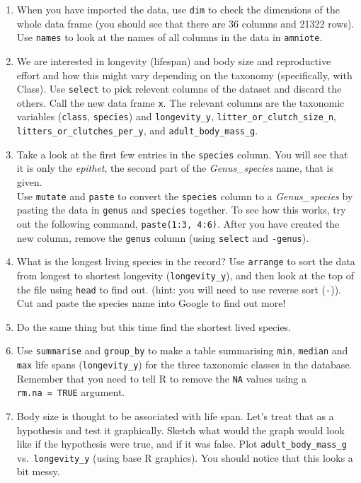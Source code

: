 \documentclass[
  a4paperpaper,
]{book}
\begin{document}
\begin{enumerate}
\def\labelenumi{\arabic{enumi}.}
\item
  When you have imported the data, use \texttt{dim} to check the dimensions of the whole data frame (you should see that there are 36 columns and 21322 rows). Use \texttt{names} to look at the names of all columns in the data in \texttt{amniote}.
\item
  We are interested in longevity (lifespan) and body size and reproductive effort and how this might vary depending on the taxonomy (specifically, with Class). Use \texttt{select} to pick relevent columns of the dataset and discard the others. Call the new data frame \texttt{x}.
  The relevant columns are the taxonomic variables (\texttt{class}, \texttt{species}) and \texttt{longevity\_y}, \texttt{litter\_or\_clutch\_size\_n}, \texttt{litters\_or\_clutches\_per\_y}, and \texttt{adult\_body\_mass\_g}.
\item
  Take a look at the first few entries in the \texttt{species} column. You will see that it is only the \emph{epithet}, the second part of the \emph{Genus\_species} name, that is given.\\
  Use \texttt{mutate} and \texttt{paste} to convert the \texttt{species} column to a \emph{Genus\_species} by pasting the data in \texttt{genus} and \texttt{species} together. To see how this works, try out the following command, \texttt{paste(1:3,\ 4:6)}. After you have created the new column, remove the \texttt{genus} column (using \texttt{select} and \texttt{-genus}).
\item
  What is the longest living species in the record? Use \texttt{arrange} to sort the data from longest to shortest longevity (\texttt{longevity\_y}), and then look at the top of the file using \texttt{head} to find out. (hint: you will need to use reverse sort (\texttt{-})). Cut and paste the species name into Google to find out more!
\item
  Do the same thing but this time find the shortest lived species.
\item
  Use \texttt{summarise} and \texttt{group\_by} to make a table summarising \texttt{min}, \texttt{median} and \texttt{max} life spans (\texttt{longevity\_y}) for the three taxonomic classes in the database. Remember that you need to tell R to remove the \texttt{NA} values using a \texttt{rm.na\ =\ TRUE} argument.
\item
  Body size is thought to be associated with life span. Let's treat that as a hypothesis and test it graphically. Sketch what would the graph would look like if the hypothesis were true, and if it was false. Plot \texttt{adult\_body\_mass\_g} vs.~\texttt{longevity\_y} (using base R graphics). You should notice that this looks a bit messy.

\end{enumerate}
\end{document}

